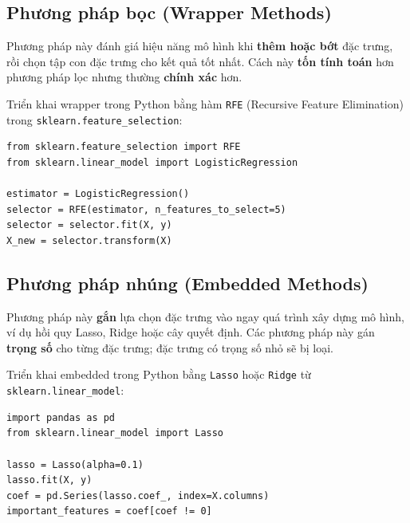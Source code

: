 \subsection{Phương pháp bọc (Wrapper Methods)}

\begin{phuongphap}[title={Ý tưởng Wrapper}]
Phương pháp này đánh giá hiệu năng mô hình khi \textbf{thêm hoặc bớt} đặc trưng, rồi chọn tập con đặc trưng cho kết quả tốt nhất. Cách này \textbf{tốn tính toán} hơn phương pháp lọc nhưng thường \textbf{chính xác} hơn.
\end{phuongphap}

\begin{vidu}[title={Wrapper trong Python --- RFE}]
Triển khai wrapper trong Python bằng hàm \texttt{RFE} (Recursive Feature Elimination) trong \texttt{sklearn.feature\_selection}:
\begin{lstlisting}
from sklearn.feature_selection import RFE
from sklearn.linear_model import LogisticRegression

estimator = LogisticRegression()
selector = RFE(estimator, n_features_to_select=5)
selector = selector.fit(X, y)
X_new = selector.transform(X)
\end{lstlisting}
\end{vidu}

\subsection{Phương pháp nhúng (Embedded Methods)}

\begin{phuongphap}[title={Ý tưởng Embedded}]
Phương pháp này \textbf{gắn} lựa chọn đặc trưng vào ngay quá trình xây dựng mô hình, ví dụ hồi quy Lasso, Ridge hoặc cây quyết định. Các phương pháp này gán \textbf{trọng số} cho từng đặc trưng; đặc trưng có trọng số nhỏ sẽ bị loại.
\end{phuongphap}

\begin{vidu}[title={Embedded trong Python --- Lasso}]
Triển khai embedded trong Python bằng \texttt{Lasso} hoặc \texttt{Ridge} từ \texttt{sklearn.linear\_model}:
\begin{lstlisting}
import pandas as pd
from sklearn.linear_model import Lasso

lasso = Lasso(alpha=0.1)
lasso.fit(X, y)
coef = pd.Series(lasso.coef_, index=X.columns)
important_features = coef[coef != 0]
\end{lstlisting}
\end{vidu}

